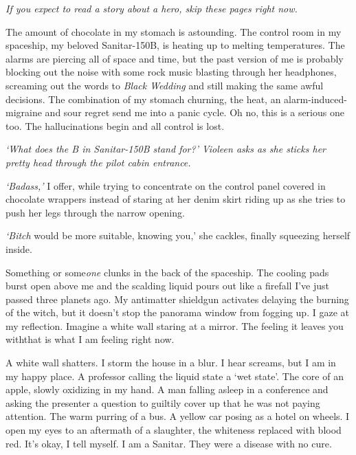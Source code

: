 ﻿\newenvironment{flashback}{\em}{}
\newcommand{\varending}[2]{\textbf{Ending #1.} #2}

\begin{center}
\textit{If you expect to read a story about a hero, skip these pages
right now.}
\end{center}

\hsep

The amount of chocolate in my stomach is astounding. The control room
in my spaceship, my beloved Sanitar-150B, is heating up to melting
temperatures. The alarms are piercing all of space and time, but the
past version of me is probably blocking out the noise with some rock
music blasting through her headphones, screaming out the words to
\textit{Black Wedding} and still making the same awful decisions. The
combination of my stomach churning, the heat, an
alarm-induced-migraine and sour regret send me into a panic cycle. Oh
no, this is a serious one too. The hallucinations begin and all
control is lost.

\hsep

\begin{flashback}
`What does the B in Sanitar-150B stand for?' Violeen asks
as she sticks her pretty head through the pilot cabin entrance.

\emph{`Badass,'} I offer, while trying to concentrate on the control
panel covered in chocolate wrappers instead of staring at her denim
skirt riding up as she tries to push her legs through the narrow
opening.

\emph{`Bitch} would be more suitable, knowing you,' she cackles,
finally squeezing herself inside.

Something or some\emph{one} clunks in the back of the spaceship. The
cooling pads burst open above me and the scalding liquid pours out
like a firefall I've just passed three planets ago. My antimatter
shieldgun activates delaying the burning of the witch, but it doesn't
stop the panorama window from fogging up. I gaze at my
reflection. Imagine a white wall staring at a mirror. The feeling it
leaves you with\textemdash that is what I am feeling right now.

A white wall shatters. I storm the house in a blur. I hear screams,
but I am in my happy place. A professor calling the liquid state a
`wet state'. The core of an apple, slowly oxidizing in my hand. A man
falling asleep in a conference and asking the presenter a question to
guiltily cover up that he was not paying attention. The warm purring
of a bus. A yellow car posing as a hotel on wheels. I open my eyes to
an aftermath of a slaughter, the whiteness replaced with blood
red. It's okay, I tell myself. I am a Sanitar. They were a disease
with no cure.
\end{flashback}

